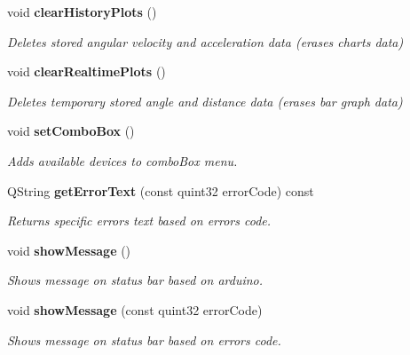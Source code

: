 \begin{DoxyCompactItemize}
$$void \textbf{ clear\+History\+Plots} ()
\begin{DoxyCompactList}\small\item\em Deletes stored angular velocity and acceleration data (erases charts data) \end{DoxyCompactList}\item 
void \textbf{ clear\+Realtime\+Plots} ()
\begin{DoxyCompactList}\small\item\em Deletes temporary stored angle and distance data (erases bar graph data) \end{DoxyCompactList}\item 
void \textbf{ set\+Combo\+Box} ()
\begin{DoxyCompactList}\small\item\em Adds available devices to combo\+Box menu. \end{DoxyCompactList}\item 
Q\+String \textbf{ get\+Error\+Text} (const quint32 error\+Code) const
\begin{DoxyCompactList}\small\item\em Returns specific error\textquotesingle{}s text based on error\textquotesingle{}s code. \end{DoxyCompactList}\item 
void \textbf{ show\+Message} ()
\begin{DoxyCompactList}\small\item\em Shows message on status bar based on arduino. \end{DoxyCompactList}\item 
void \textbf{ show\+Message} (const quint32 error\+Code)
\begin{DoxyCompactList}\small\item\em Shows message on status bar based on error\textquotesingle{}s code. \end{DoxyCompactList}\end{DoxyCompactItemize}
